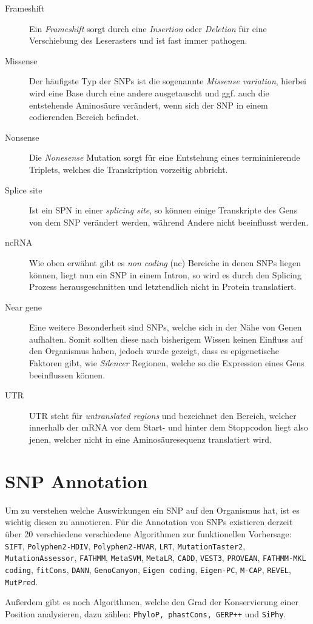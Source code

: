 \begin{description}
\item[Frameshift]
Ein \emph{Frameshift} sorgt durch eine \emph{Insertion} oder \emph{Deletion} für eine Verschiebung des Leserasters und ist fast immer pathogen.
\item[Missense]
Der häufigste Typ der \ac{SNP}s ist die sogenannte \emph{Missense variation}, hierbei wird eine Base durch eine andere ausgetauscht und ggf. auch die entstehende Aminosäure verändert, wenn sich der \ac{SNP} in einem codierenden Bereich befindet. 
\item[Nonsense]
Die \emph{Nonesense} Mutation sorgt für eine Entstehung eines termininierende Triplets, welches die Transkription vorzeitig abbricht.
\item[Splice site]
Ist ein SPN in einer \emph{splicing site}, so können einige Transkripte des Gens von dem \ac{SNP} verändert werden, während Andere nicht beeinflusst werden.
\item[ncRNA]
Wie oben erwähnt gibt es \emph{non coding} (nc) Bereiche in denen \ac{SNP}s liegen können, liegt nun ein \ac{SNP} in einem Intron, so wird es durch den Splicing Prozess herausgeschnitten und letztendlich nicht in Protein translatiert. 
\item[Near gene]
Eine weitere Besonderheit sind SNPs, welche sich in der Nähe von Genen aufhalten. Somit sollten diese nach bisherigem Wissen keinen Einfluss auf den Organismus haben, jedoch wurde gezeigt, dass es epigenetische Faktoren gibt, wie \emph{Silencer} Regionen, welche so die Expression eines Gens beeinflussen können\cite{Maston.2006}. 
\item[UTR]
UTR steht für \emph{untranslated regions} und bezeichnet den Bereich, welcher innerhalb der mRNA vor dem Start- und hinter dem Stoppcodon liegt also jenen, welcher nicht in eine Aminosäuresequenz translatiert wird.
\end{description}




\section{SNP Annotation}
\begin{sloppypar}
Um zu verstehen welche Auswirkungen ein \ac{SNP} auf den Organismus hat, ist es wichtig diesen zu annotieren. 
Für die Annotation von \ac{SNP}s existieren derzeit über 20 verschiedene verschiedene Algorithmen zur funktionellen Vorhersage: \texttt{SIFT}, \texttt{Polyphen2-HDIV}, \texttt{Polyphen2-HVAR}, \texttt{LRT}, \texttt{MutationTaster2}, \texttt{MutationAssessor}, \texttt{FATHMM}, \texttt{MetaSVM}, \texttt{MetaLR}, \texttt{CADD}, \texttt{VEST3}, \texttt{PROVEAN}, \texttt{FATHMM-MKL coding}, \texttt{fitCons}, \texttt{DANN}, \texttt{GenoCanyon}, \texttt{Eigen coding}, \texttt{Eigen-PC}, \texttt{M-CAP}, \texttt{REVEL}, \texttt{MutPred}. 
\end{sloppypar}
Außerdem gibt es noch Algorithmen, welche den Grad der Konservierung einer Position analysieren, dazu zählen: \texttt{PhyloP, phastCons, GERP++} und \texttt{SiPhy}.

